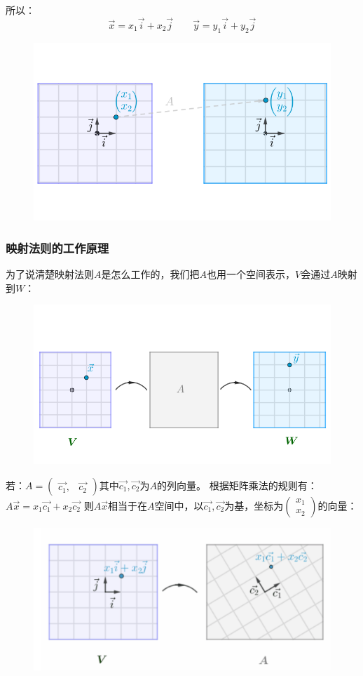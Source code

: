 \documentclass[12pt]{article}
\begin{document}
所以：
$$\vec{x}=x_1\vec{i}+x_2\vec{j}\qquad\vec{y}=y_1\vec{i}+y_2\vec{j}$$
\begin{figure}[H]
\centering
\includegraphics[width=.5\textwidth]{fig/UnderstandMatrixMultiplication_4.png}
\end{figure}

\subsubsection{映射法则的工作原理}
为了说清楚映射法则$A$是怎么工作的，我们把$A$也用一个空间表示，$V$会通过$A$映射到$W$：
\begin{figure}[H]
\centering
\includegraphics[width=.5\textwidth]{fig/UnderstandMatrixMultiplication_5.png}
\end{figure}

若：$A=\begin{pmatrix}\vec{c_1},&\vec{c_2}\end{pmatrix}$其中$\vec{c_1},\vec{c_2}$为$A$的列向量。
根据矩阵乘法的规则有：
$A\vec{x}=x_1\vec{c_1}+x_2\vec{c_2}$
则$A\vec{x}$相当于在$A$空间中，以$\vec{c_1},\vec{c_2}$为基，坐标为$\begin{pmatrix}x_1\\x_2\end{pmatrix}$的向量：
\begin{figure}[H]
\centering
\includegraphics[width=.8\textwidth]{fig/UnderstandMatrixMultiplication_6.png}
\end{figure}
\end{document}
